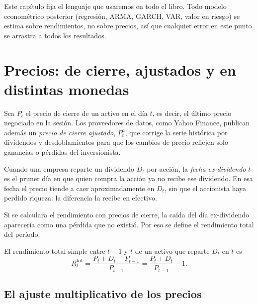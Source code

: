 Este capítulo fija el lenguaje que usaremos en todo el libro. Todo modelo econométrico posterior
(regresión, ARMA, GARCH, VAR, valor en riesgo) se estima sobre rendimientos, no sobre precios, así que
cualquier error en este punto se arrastra a todos los resultados.

\section{Precios: de cierre, ajustados y en distintas monedas}

Sea $P_t$ el precio de cierre de un activo en el día $t$, es decir, el último precio negociado en la
sesión. Los proveedores de datos, como Yahoo Finance, publican además un \emph{precio de cierre
ajustado}, $P^{a}_t$, que corrige la serie histórica por dividendos y desdoblamientos para que los
cambios de precio reflejen solo ganancias o pérdidas del inversionista.

\begin{definicion}
Cuando una empresa reparte un dividendo $D_t$ por acción, la \emph{fecha ex-dividendo} $t$ es el primer
día en que quien compra la acción ya no recibe ese dividendo. En esa fecha el precio tiende a caer
aproximadamente en $D_t$, sin que el accionista haya perdido riqueza: la diferencia la recibe en efectivo.
\end{definicion}

Si se calculara el rendimiento con precios de cierre, la caída del día ex-dividendo aparecería como una
pérdida que no existió. Por eso se define el rendimiento total del período.

\begin{definicion}
El rendimiento total simple entre $t-1$ y $t$ de un activo que reparte $D_t$ en $t$ es
\begin{equation}\label{eq:rtotal}
  R^{\mathrm{tot}}_t=\frac{P_t+D_t-P_{t-1}}{P_{t-1}}=\frac{P_t+D_t}{P_{t-1}}-1 .
\end{equation}
\end{definicion}

\subsection{El ajuste multiplicativo de los precios}

